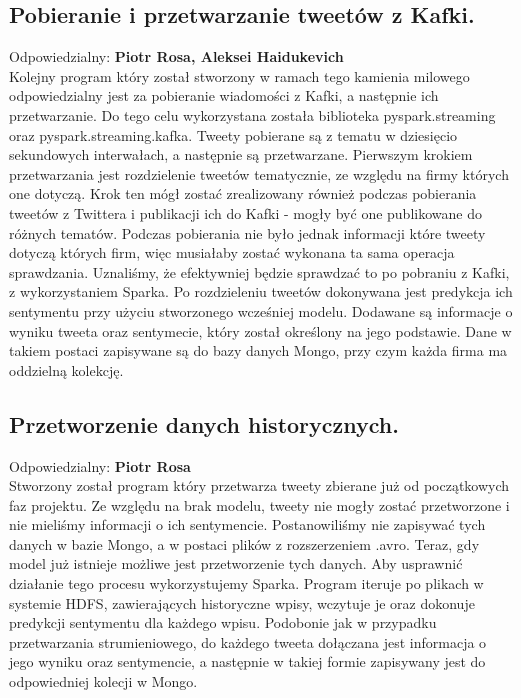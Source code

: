\documentclass[a4paper,11pt, notitlepage ]{article}
\begin{document}
    \subsection{Pobieranie i przetwarzanie tweetów z Kafki.}
    Odpowiedzialny: \textbf{Piotr Rosa, Aleksei Haidukevich}\\
    Kolejny program który został stworzony w ramach tego kamienia milowego odpowiedzialny jest za pobieranie wiadomości z Kafki, a następnie ich przetwarzanie. Do tego celu wykorzystana została biblioteka pyspark.streaming oraz pyspark.streaming.kafka. Tweety pobierane są z tematu w dziesięcio sekundowych interwałach, a następnie są przetwarzane. Pierwszym krokiem przetwarzania jest rozdzielenie tweetów tematycznie, ze względu na firmy których one dotyczą. Krok ten mógł zostać zrealizowany również podczas pobierania tweetów z Twittera i publikacji ich do Kafki - mogły być one publikowane do różnych tematów. Podczas pobierania nie było jednak informacji które tweety dotyczą których firm, więc musiałaby zostać wykonana ta sama operacja sprawdzania. Uznaliśmy, że efektywniej będzie sprawdzać to po pobraniu z Kafki, z wykorzystaniem Sparka. Po rozdzieleniu tweetów dokonywana jest predykcja ich sentymentu przy użyciu stworzonego wcześniej modelu. Dodawane są informacje o wyniku tweeta oraz sentymecie, który został określony na jego podstawie. Dane w takiem postaci zapisywane są do bazy danych Mongo, przy czym każda firma ma oddzielną kolekcję.
    
    \subsection{Przetworzenie danych historycznych.}
    Odpowiedzialny: \textbf{Piotr Rosa}\\
    Stworzony został program który przetwarza tweety zbierane już od początkowych faz projektu. Ze względu na brak modelu, tweety nie mogły zostać przetworzone i nie mieliśmy informacji o ich sentymencie. Postanowiliśmy nie zapisywać tych danych w bazie Mongo, a w postaci plików z rozszerzeniem .avro. Teraz, gdy model już istnieje możliwe jest przetworzenie tych danych. Aby usprawnić działanie tego procesu wykorzystujemy Sparka. Program iteruje po plikach w systemie HDFS, zawierających historyczne wpisy, wczytuje je oraz dokonuje predykcji sentymentu dla każdego wpisu. Podobonie jak w przypadku przetwarzania strumieniowego, do każdego tweeta dołączana jest informacja o jego wyniku oraz sentymencie, a następnie w takiej formie zapisywany jest do odpowiedniej kolecji w Mongo.
\end{document}
